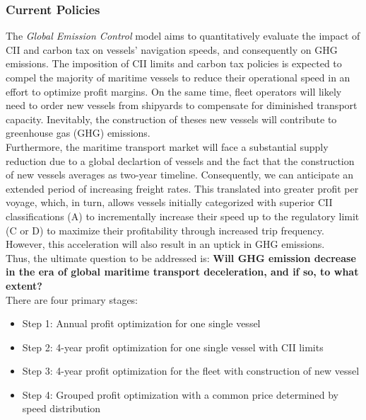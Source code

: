 \documentclass[a4paper,12pt]{article}
\begin{document}
\subsubsection{Current Policies}
The \textit{Global Emission Control} model aims to quantitatively evaluate the impact of CII and carbon tax on vessels' navigation speeds, and consequently on GHG emissions.
The imposition of CII limits and carbon tax policies is expected to compel the majority of maritime vessels to reduce their operational speed in an effort to optimize profit margins.
On the same time, fleet operators will likely need to order new vessels from shipyards to compensate for diminished transport capacity.
Inevitably, the construction of theses new vessels will contribute to greenhouse gas (GHG) emissions.\\

Furthermore, the maritime transport market will face a substantial supply reduction due to a global declartion of vessels and the fact that the construction of new vessels averages as two-year timeline.
Consequently, we can anticipate an extended period of increasing freight rates.
This translated into greater profit per voyage, which, in turn, allows vessels initially categorized with superior CII classifications (A) to incrementally increase their speed up to the regulatory limit (C or D) to maximize their profitability through increased trip frequency.
However, this acceleration will also result in an uptick in GHG emissions.\\

Thus, the ultimate question to be addressed is: \textbf{Will GHG emission decrease in the era of global maritime transport deceleration, and if so, to what extent?}\\

There are four primary stages:
\begin{itemize}
	\item Step 1: Annual profit optimization for one single vessel
	\item Step 2: 4-year profit optimization for one single vessel with CII limits
	\item Step 3: 4-year profit optimization for the fleet with construction of new vessel
	\item Step 4: Grouped profit optimization with a common price determined by speed distribution \\
\end{itemize}
\end{document}
